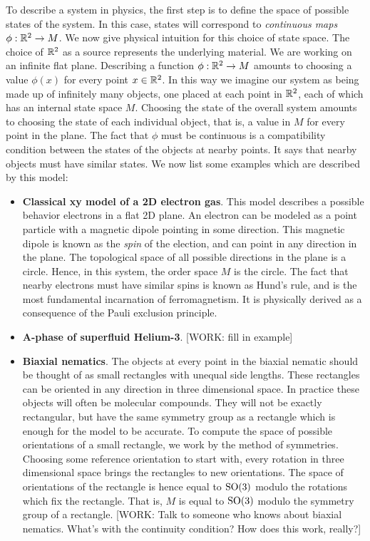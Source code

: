 To describe a system in physics, the first step is to define the space of possible states of the system. In this case, states will correspond to \textit{continuous maps $\phi: \mathbb{R}^2\to M$}. We now give physical intuition for this choice of state space. The choice of $\mathbb{R}^2$ as a source represents the underlying material. We are working on an infinite flat plane. Describing a function $\phi: \mathbb{R}^2\to M$ amounts to choosing a value $\phi(x)$ for every point $x\in \mathbb{R}^2$. In this way we imagine our system as being made up of infinitely many objects, one placed at each point in $\mathbb{R}^2$, each of which has an internal state space $M$. Choosing the state of the overall system amounts to choosing the state of each individual object, that is, a value in $M$ for every point in the plane. The fact that $\phi$ must be continuous is a compatibility condition between the states of the objects at nearby points. It says that nearby objects must have similar states. We now list some examples which are described by this model:

\begin{itemize}
\item \textbf{Classical xy model of a 2D electron gas}. This model describes a possible behavior electrons in a flat 2D plane. An electron can be modeled as a point particle with a magnetic dipole pointing in some direction. This magnetic dipole is known as the \textit{spin} of the election, and can point in any direction in the plane. The topological space of all possible directions in the plane is a circle. Hence, in this system, the order space $M$ is the circle. The fact that nearby electrons must have similar spins is known as Hund’s rule, and is the most fundamental incarnation of ferromagnetism. It is physically derived as a consequence of the Pauli exclusion principle.

\item \textbf{A-phase of superfluid Helium-3}.  [WORK: fill in example]

\item \textbf{Biaxial nematics}. The objects at every point in the biaxial nematic should be thought of as small rectangles with unequal side lengths. These rectangles can be oriented in any direction in three dimensional space. In practice these objects will often be molecular compounds. They will not be exactly rectangular, but have the same symmetry group as a rectangle which is enough for the model to be accurate. To compute the space of possible orientations of a small rectangle, we work by the method of symmetries. Choosing some reference orientation to start with, every rotation in three dimensional space brings the rectangles to new orientations. The space of orientations of the rectangle is hence equal to $\operatorname{SO}(3)$ modulo the rotations which fix the rectangle. That is, $M$ is equal to $\operatorname{SO}(3)$ modulo the symmetry group of a rectangle. [WORK: Talk to someone who knows about biaxial nematics. What's with the continuity condition? How does this work, really?]
\end{itemize}

